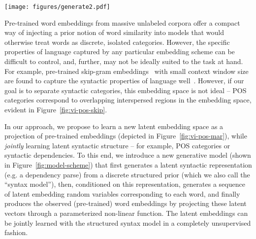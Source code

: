 \documentclass[11pt,a4paper]{article}
\begin{document}
\begin{figure*}[!t]
   \centering
    \texttt{[image: figures/generate2.pdf]}
    \vspace{-1.5mm}
    \caption{Depiction of proposed generative model. The syntax model is composed of discrete random variables, . Each  is a latent continuous embeddings sampled from Gaussian distribution conditioned on , while  is the observed embedding, deterministically derived from . The left portion depicts how the neural projector maps the simple Gaussian  to a more complex distribution in the output space. The right portion depicts two instantiations of the syntax model in our approach: one is Markov-structured and the other is DMV-structured. For DMV,  is the latent dependency tree structure.}
    \label{fig:model-scheme}
  \vspace{-5mm}
\end{figure*}
Pre-trained word embeddings from massive unlabeled corpora offer a compact way of injecting a prior notion of word similarity into models that would otherwise treat words as discrete, isolated categories. 
However, the specific properties of language captured by any particular embedding scheme can be difficult to control, and, further, may not be ideally suited to the task at hand. For example, pre-trained skip-gram embeddings~\citep{mikolov2013efficient} with small context window size are found to capture the syntactic properties of language well~\citep{bansal2014tailoring, lin2015unsupervised}. However, if our goal is to separate syntactic categories, this embedding space is not ideal -- POS categories correspond to overlapping interspersed regions in the embedding space, evident in Figure~\ref{fig:vi-pos-skip}.


In our approach, we propose to learn a new latent embedding space as a projection of pre-trained embeddings (depicted in Figure~\ref{fig:vi-pos-mar}), while \emph{jointly} learning latent syntactic structure -- for example, POS categories or syntactic dependencies.
To this end, we introduce 
a new generative model  (shown in Figure~\ref{fig:model-scheme}) that first generates a latent syntactic representation (e.g. a dependency parse) from a discrete structured prior (which we also call the ``syntax model''),
then, conditioned on this representation, generates a sequence of latent embedding random variables corresponding to each word, and finally produces the observed (pre-trained) word embeddings by projecting these latent vectors through a parameterized non-linear function.
 The latent embeddings can be jointly learned with the structured syntax model in a completely unsupervised fashion. 
\end{document}
